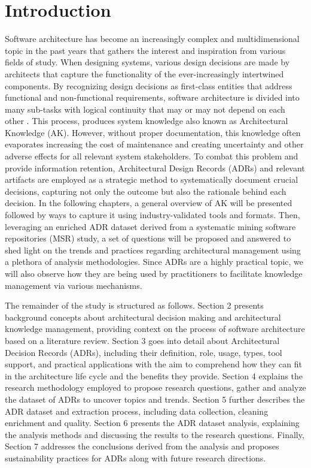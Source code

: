 \chapter{Introduction}
    Software architecture has become an increasingly complex and multidimensional topic in the past years that gathers the interest and inspiration from various fields of study. When designing systems, various design decisions are made by architects that capture the functionality of the ever-increasingly intertwined components. By recognizing design decisions as first-class entities that address functional and non-functional requirements, software architecture is divided into many sub-tasks with logical continuity that may or may not depend on each other \cite{Arch+DesignDescisions}. This process, produces system knowledge also known as Architectural Knowledge (AK).
    However, without proper documentation, this knowledge often evaporates increasing the cost of maintenance and creating uncertainty and other adverse effects for all relevant system stakeholders. To combat this problem and provide information retention,  Architectural Design Records (ADRs) and relevant artifacts are employed as a strategic method to systematically document crucial decisions, capturing not only the outcome but also the rationale behind each decision. In the following chapters, a general overview of AK will be presented followed by ways to capture it using industry-validated tools and formats. Then, leveraging an enriched ADR dataset derived from a systematic mining software repositories (MSR) study, a set of questions will be proposed and answered to shed light on the trends and practices regarding architectural management using a plethora of analysis methodologies. Since ADRs are a highly practical topic, we will also observe how they are being used by practitioners to facilitate knowledge management via various mechanisms.

    The remainder of the study is structured as follows. Section 2 presents background concepts about architectural decision making and architectural knowledge management, providing context on the process of software architecture based on a literature review. Section 3 goes into detail about Architectural Decision Records (ADRs), including their definition, role, usage, types, tool support, and practical applications with the aim to comprehend how they can fit in the architecture life cycle and the benefits they provide. Section 4 explains the research methodology employed to propose research questions, gather and analyze the dataset of ADRs to uncover topics and trends. Section 5 further describes the ADR dataset and extraction process, including data collection, cleaning enrichment and quality. Section 6 presents the ADR dataset analysis, explaining the analysis methods and discussing the results to the research questions. Finally, Section 7 addresses the conclusions derived from the analysis and proposes sustainability practices for ADRs along with future research directions.